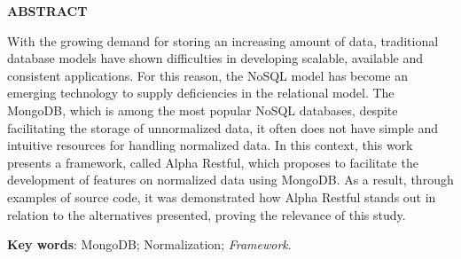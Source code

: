 \vfill
\begin{center}
{\textbf{ABSTRACT}\\}
\end{center}

\noindent

With the growing demand for storing an increasing amount of data, traditional database models have shown difficulties in developing scalable, available and consistent applications. For this reason, the NoSQL model has become an emerging technology to supply deficiencies in the relational model. The MongoDB, which is among the most popular NoSQL databases, despite facilitating the storage of unnormalized data, it often does not have simple and intuitive resources for handling normalized data. In this context, this work presents a framework, called Alpha Restful, which proposes to facilitate the development of features on normalized data using MongoDB. As a result, through examples of source code, it was demonstrated how Alpha Restful stands out in relation to the alternatives presented, proving the relevance of this study.
 
 \vspace{\onelineskip}
    
 \noindent
 \textbf{Key words}: MongoDB; Normalization; \textit{Framework}.
